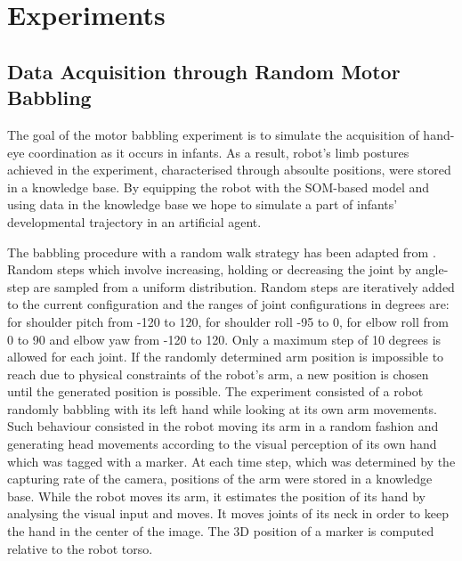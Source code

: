 \chapter{Experiments}
\label{chap:experiments}

\section{Data Acquisition through Random Motor Babbling}
\label{sec:exp-mb}
The goal of the motor babbling experiment is to simulate the acquisition of hand-eye coordination as it occurs in infants. 
As a result, robot's limb postures achieved in the experiment, characterised through absoulte positions, were stored in a knowledge base.
By equipping the robot with the SOM-based model and using data in the knowledge base we hope to simulate a part of infants' developmental trajectory in an artificial agent. 

The babbling procedure with a random walk strategy has been adapted from 
\citep{SchillaciH11}. Random steps which involve increasing, holding or 
decreasing the joint by angle-step are sampled from a uniform distribution. 
Random steps are iteratively added to the current configuration and the ranges 
of joint configurations in degrees are: for shoulder pitch from -120 to 120, for 
shoulder roll -95 to 0, for elbow roll from 0 to 90 and elbow yaw from -120 to 
120. Only a maximum step of 10 degrees is allowed for each joint. If the 
randomly determined arm position is impossible to reach due to physical 
constraints of the robot's arm, a new position is chosen until the generated 
position is possible. The experiment consisted of a robot randomly babbling with 
its left hand while looking at its own arm movements. Such behaviour consisted 
in the robot moving its arm in a random fashion and generating head movements 
according to the visual perception of its own hand which was tagged with a 
marker. At each time step, which was determined by the capturing rate of the 
camera, positions of the arm were stored in a knowledge base. While the robot 
moves its arm, it estimates the position of its hand by analysing the visual 
input and moves. It moves joints of its neck in order to keep the hand in the 
center of the image. The 3D position of a marker is computed relative to the 
robot torso.

